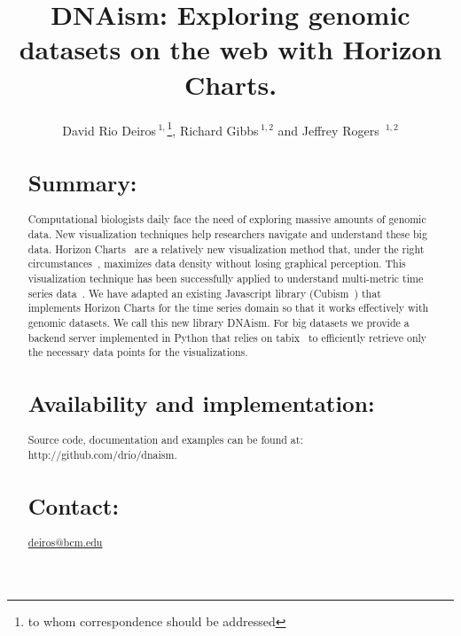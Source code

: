 \documentclass{bioinfo}
\begin{document}

\title[short Title]{DNAism: Exploring genomic datasets on the web with Horizon Charts. }

\author[Sample \textit{et~al}]{David Rio Deiros\,$^{1,}$\footnote{to whom correspondence should be addressed},
Richard Gibbs\,$^{1,2}$ and Jeffrey Rogers\, $^{1,2}$}

\address{$^{1}$Human Genome Sequencing Center, Baylor College of Medicine, Houston, TX.\\
$^{2}$Department of Molecular and Human Genetics, Baylor College of Medicine, Houston, TX.}



\maketitle

\begin{abstract}

\section{Summary:}

Computational biologists daily face the need of exploring massive amounts of
genomic data. New visualization techniques help researchers navigate and
understand these big data. Horizon Charts~\citep{time-in-the-horizon} are a
relatively new visualization method that, under the right
circumstances~\citep{2009-horizon}, maximizes data density without losing
graphical perception. This visualization technique has been successfully
applied to understand multi-metric time series
data~\citep{time-in-the-horizon}. We have adapted an existing Javascript
library (Cubism~\citep{cubism}) that implements
Horizon Charts for the time series domain so that it works effectively with
genomic datasets. We call this new library DNAism. For big datasets we provide
a backend server implemented in Python that relies on tabix~\citep{tabix-li} to
efficiently retrieve only the necessary data points for the visualizations.

\section{Availability and implementation:}
Source code, documentation and examples can be found at:
http://github.com/drio/dnaism.

\section{Contact:} \href{deiros@bcm.edu}{deiros@bcm.edu}
\end{abstract}
\end{document}
